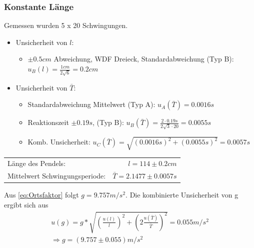 \documentclass[
	a4paper,
	12pt,
	pagesize,
	ngerman
]{scrartcl}
\begin{document}
	\subsubsection{Konstante Länge}
	Gemessen wurden 5 x 20 Schwingungen.
	\begin{itemize}
		\item Unsicherheit von \(l\): 
			\begin{itemize}
				\item $\pm0.5\si{cm}$ Abweichung, WDF Dreieck, Standardabweichung (Typ B): \( u_B(l) = \frac{1\si{cm}}{2\sqrt{6}} = 0.2\si{cm} \)
			\end{itemize}

		\item Unsicherheit von \(\bar{T}\): 
			\begin{itemize}
				\item Standardabweichung Mittelwert (Typ A): \( u_A(\bar{T}) = 0.0016\si{s} \)
				\item Reaktionszeit  $\pm0.19 \si{s}$, (Typ B): \( u_B(\bar{T}) = \frac{2\cdot0.19\si{s}}{2\sqrt{3}\cdot20} = 0.0055\si{s} \)
				\item Komb. Unsicherheit: $ u_C(\bar{T}) = \sqrt{(0.0016\si{s})^2+(0.0055\si{s})^2} = 0.0057 \si{s} $
			\end{itemize}
	\end{itemize}

	\begin{tabular}{l r}
		Länge des Pendels: & \(l = 114 \pm 0.2\si{cm} \) \\
		Mittelwert Schwingungsperiode: & \(\bar{T} = 2.1477 \pm 0.0057\si{s} \) \\
	\end{tabular} 
	

	\par

	\noindent Aus \eqref{eq:Ortsfaktor} folgt $ g = 9.757  \si{m/s^2}$. Die kombinierte Unsicherheit von g ergibt sich aus
	\begin{align*}
		u(g) = g * \sqrt{\left(\frac{u(l)}{l}\right)^2 + \left(2\frac{u(\bar{T})}{\bar{T}}\right)^2} = 0.055 \si{m/s^2} \\
		\Rightarrow{} g = (9.757 \pm 0.055) \si{m/s^2}
	\end{align*}
	
\end{document}

